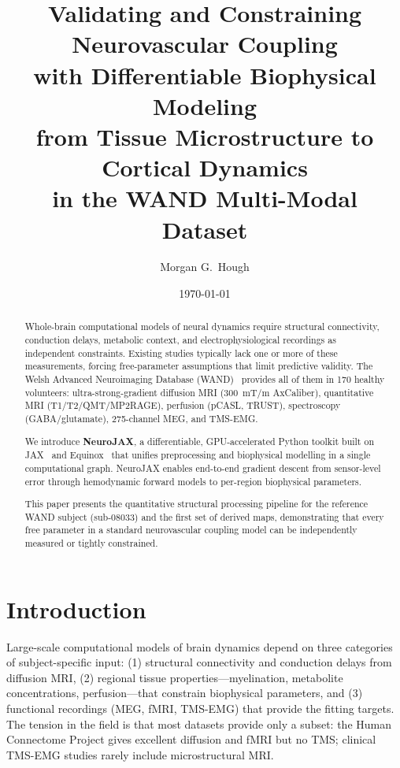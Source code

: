 \documentclass[11pt,a4paper]{article}\usepackage[]{graphicx}\usepackage[]{xcolor}
\title{Validating and Constraining Neurovascular Coupling\\
  with Differentiable Biophysical Modeling\\
  from Tissue Microstructure to Cortical Dynamics\\
  in the WAND Multi-Modal Dataset}
\author{Morgan G.\ Hough}
\date{\today}
\begin{document}
\maketitle




\begin{abstract}
Whole-brain computational models of neural dynamics require structural
connectivity, conduction delays, metabolic context, and electrophysiological
recordings as independent constraints. Existing studies typically lack one
or more of these measurements, forcing free-parameter assumptions that
limit predictive validity. The Welsh Advanced Neuroimaging Database
(WAND)~\citep{Mayerand2025wand} provides all of them in 170 healthy
volunteers: ultra-strong-gradient diffusion MRI (300~mT/m AxCaliber),
quantitative MRI (T1/T2/QMT/MP2RAGE), perfusion (pCASL, TRUST),
spectroscopy (GABA/glutamate), 275-channel MEG, and TMS-EMG.

We introduce \textbf{NeuroJAX}, a differentiable, GPU-accelerated Python
toolkit built on JAX~\citep{Bradbury2018jax} and
Equinox~\citep{Kidger2021equinox} that unifies preprocessing and
biophysical modelling in a single computational graph. NeuroJAX enables
end-to-end gradient descent from sensor-level error through hemodynamic
forward models to per-region biophysical parameters.

This paper presents the quantitative structural processing pipeline for
the reference WAND subject (sub-08033) and the first set of derived maps,
demonstrating that every free parameter in a standard neurovascular
coupling model can be independently measured or tightly constrained.
\end{abstract}

\section{Introduction}

Large-scale computational models of brain dynamics
\citep{Deco2013rww,Riera2006neurovascular} depend on three categories of
subject-specific input: (1) structural connectivity and conduction delays
from diffusion MRI, (2) regional tissue properties---myelination, metabolite
concentrations, perfusion---that constrain biophysical parameters, and
(3) functional recordings (MEG, fMRI, TMS-EMG) that provide the fitting
targets. The tension in the field is that most datasets provide only a
subset: the Human Connectome Project gives excellent diffusion and fMRI but
no TMS; clinical TMS-EMG studies rarely include microstructural MRI.
\end{document}
